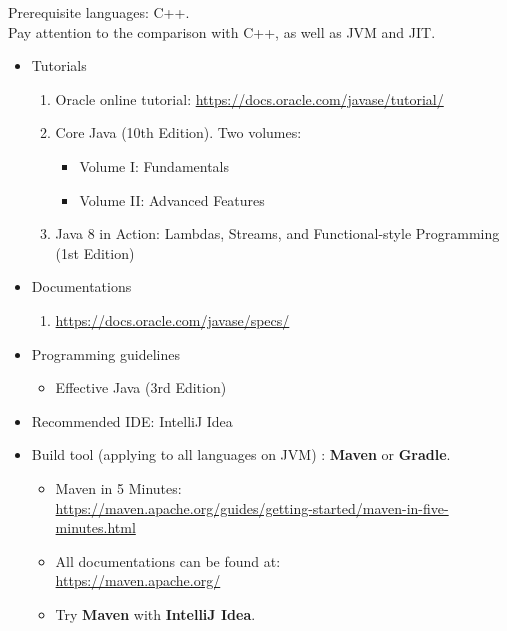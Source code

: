 \documentclass{article}
\begin{document}
\begin{itemize}
    Prerequisite languages: C++.\\
    Pay attention to the comparison with C++, as well as JVM and JIT.
    \begin{itemize}
        \item Tutorials
        \begin{enumerate}
            \item Oracle online tutorial:
        \href{https://docs.oracle.com/javase/tutorial/}{https://docs.oracle.com/javase/tutorial/}
            \item Core Java (10th Edition). Two volumes:
            \begin{itemize}
                \item Volume I: Fundamentals \cite{gvero2013core1}
                \item Volume II: Advanced Features \cite{tarimci2014core2}
            \end{itemize}
            \item Java 8 in Action: Lambdas, Streams, and Functional-style Programming (1st Edition) \cite{urma2014java}
        \end{enumerate}
        \item Documentations
        \begin{enumerate}
            \item \href{https://docs.oracle.com/javase/specs/}{https://docs.oracle.com/javase/specs/}
        \end{enumerate}
        \item Programming guidelines
        \begin{itemize}
            \item Effective Java (3rd Edition) \cite{bloch2008effective}
        \end{itemize}

        \item Recommended IDE: IntelliJ Idea
        \item Build tool (applying to all languages on JVM) : \textbf{Maven} or \textbf{Gradle}.
        \begin{itemize}
            \item Maven in 5 Minutes:\\
            \href{https://maven.apache.org/guides/getting-started/maven-in-five-minutes.html}{https://maven.apache.org/guides/getting-started/maven-in-five-minutes.html}
            \item All documentations can be found at:\\
            \href{https://maven.apache.org/}{https://maven.apache.org/}
            \item Try \textbf{Maven} with \textbf{IntelliJ Idea}.
        \end{itemize}
    \end{itemize}


\end{itemize}
\end{document}
